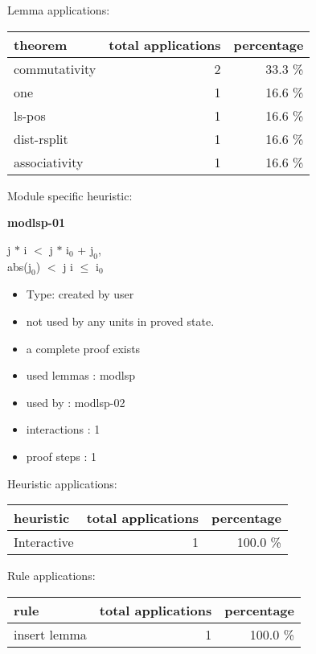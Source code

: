 \documentclass[a4paper]{article}
\begin{document}
Lemma applications:

\begin{supertabular}{l|r|r}
theorem	        & total applications & percentage \\ \hline
commutativity & 2 & 33.3 \% \\
one & 1 & 16.6 \% \\
ls-pos & 1 & 16.6 \% \\
dist-rsplit & 1 & 16.6 \% \\
associativity & 1 & 16.6 \% \\

\end{supertabular}

Module specific heuristic:

\pagebreak

{\LARGE\bf modlsp-01}\label{lemma-modlsp-01}

\medskip

j $*$ i $<$ j $*$ $\mbox{i}_{0}$ + $\mbox{j}_{0}$, \\
abs($\mbox{j}_{0}$) $<$ j \Fol i $\le$ $\mbox{i}_{0}$

\begin{itemize}

\item Type: created by user

\item not used by any units in proved state.
\item       a complete proof exists
\item       used lemmas  : modlsp
\item       used by      : modlsp-02
\item       interactions : 1
\item       proof steps  : 1
\end{itemize}

\medskip


Heuristic applications:

\begin{supertabular}{l|r|r}
heuristic	& total applications & percentage \\ \hline
Interactive & 1 & 100.0 \% \\

\end{supertabular}

Rule applications:

\begin{supertabular}{l|r|r}
rule	        & total applications & percentage \\ \hline
insert lemma & 1 & 100.0 \% \\

\end{supertabular}
\end{document}
